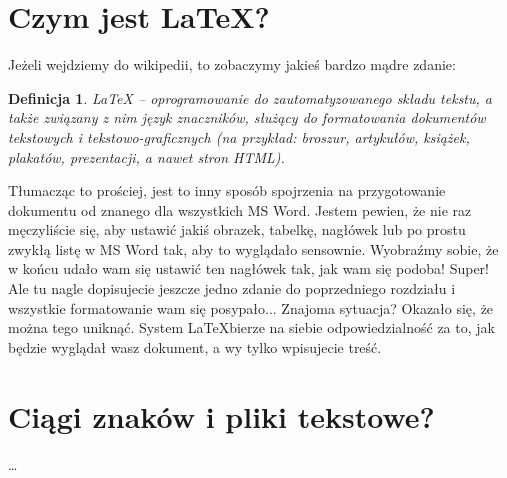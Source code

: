 \documentclass{article}
\newtheorem{definition}{Definicja}
\begin{document}
	\section{Czym jest \LaTeX?}

	Jeżeli wejdziemy do wikipedii, to zobaczymy jakieś bardzo mądre zdanie:

	\begin{definition}
		LaTeX – oprogramowanie do zautomatyzowanego składu tekstu, a także związany z nim język znaczników, służący do formatowania dokumentów tekstowych i tekstowo-graficznych (na przykład: broszur, artykułów, książek, plakatów, prezentacji, a nawet stron HTML).
	\end{definition}

	\noindent Tłumacząc to prościej, jest to inny sposób spojrzenia na przygotowanie dokumentu od znanego dla wszystkich MS Word. Jestem pewien, że nie raz męczyliście się, aby ustawić jakiś obrazek, tabelkę, nagłówek lub po prostu zwykłą listę w MS Word tak, aby to wyglądało sensownie. Wyobraźmy sobie, że w końcu udało wam się ustawić ten nagłówek tak, jak wam się podoba! Super! Ale tu nagle dopisujecie jeszcze jedno zdanie do poprzedniego rozdziału i wszystkie formatowanie wam się posypało... Znajoma sytuacja? Okazało się, że można tego uniknąć. System \LaTeX bierze na siebie odpowiedzialność za to, jak będzie wyglądał wasz dokument, a wy tylko wpisujecie treść.



	\section{Ciągi znaków i  pliki tekstowe?}
	\ldots
\end{document}
